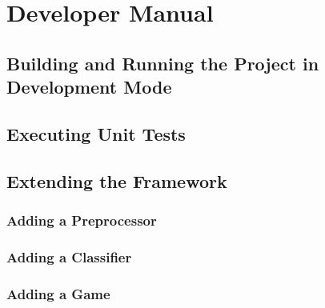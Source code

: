 \chapter{Developer Manual}
\section{Building and Running the Project in Development Mode}
\section{Executing Unit Tests}
\section{Extending the Framework}
\subsection{Adding a Preprocessor}
\subsection{Adding a Classifier}
\subsection{Adding a Game}